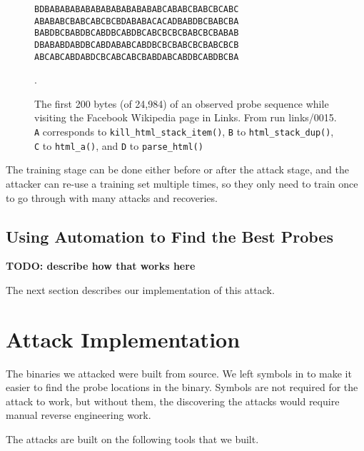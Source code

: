 \documentclass[letterpaper,twocolumn,10pt]{article}
\begin{document}
\begin{figure}
    \centering
\begin{verbatim}
BDBABABABABABABABABABABABCABABCBABCBCABC
ABABABCBABCABCBCBDABABACACADBABDBCBABCBA
BABDBCBABDBCABDBCABDBCABCBCBCBABCBCBABAB
DBABABDABDBCABDABABCABDBCBCBABCBCBABCBCB
ABCABCABDABDCBCABCABCBABDABCABDBCABDBCBA
\end{verbatim}
\caption{The first 200 bytes (of 24,984) of an observed probe sequence while
    visiting the Facebook Wikipedia page in Links. From run links/0015.
    \texttt{A} corresponds to \texttt{kill\_html\_stack\_item()}, \texttt{B} to
    \texttt{html\_stack\_dup()}, \texttt{C} to \texttt{html\_a()}, and
    \texttt{D} to \texttt{parse\_html()}}.
    \label{figure:probetext}
\end{figure}

The training stage can be done either before or after the attack stage, and the
attacker can re-use a training set multiple times, so they only need to train
once to go through with many attacks and recoveries.

\subsection{Using Automation to Find the Best Probes}

\textbf{TODO: describe how that works here}

The next section describes our implementation of this attack.

\section{Attack Implementation}

The binaries we attacked were built from source. We left symbols in to make it
easier to find the probe locations in the binary. Symbols are not required for
the attack to work, but without them, the discovering the attacks would require
manual reverse engineering work.

The attacks are built on the following tools that we built.
\end{document}
